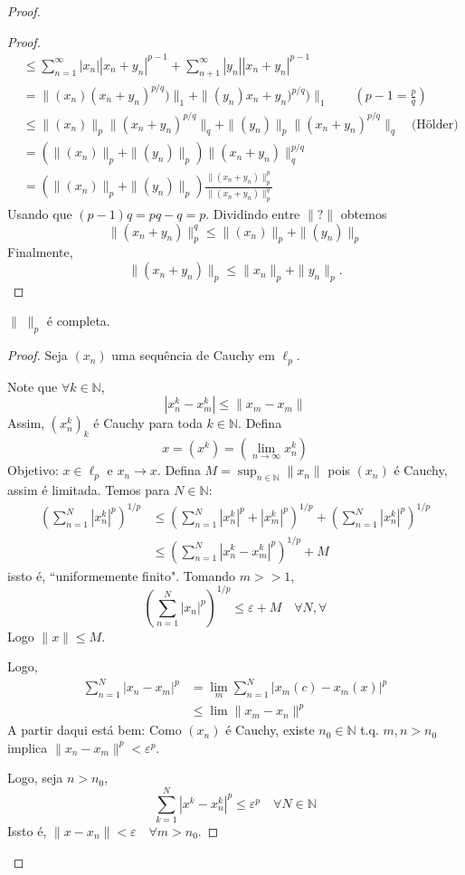 \documentclass[portuguese]{article}
\theoremstyle{definition}
\newcommand{\N}{\mathbb{N}}
\begin{document}
\begin{exer}
\begin{proof}
\begin{proof}
\begin{align*}
					&\leq\sum_{n=1}^\infty|x_n||x_n+y_n|^{p-1}+\sum_{n+1}^\infty|y_n||x_n+y_n|^{p-1}\\
					&=\|(x_n)(x_n+y_n)^{p/q})\|_1+\|(y_n)x_n+y_n)^{p/q})\|_1\qquad \left(p-1=\frac{p}{q}\right)\\
					&\leq\|(x_n)\|_p\|(x_n+y_n)^{p/q}\|_q+\|(y_n)\|_p\|(x_n+y_n)^{p/q}\|_q\quad\text{(Hölder)}\\
					&=(\|(x_n)\|_p+\|(y_n)\|_p)\|(x_n+y_n)\|_q^{p/q}\\
					&=(\|(x_n)\|_p+\|(y_n)\|_p)\frac{\|(x_n+y_n)\|_p^{p}}{\|(x_n+y_n)\|_p^q}
				\end{align*}
				Usando que $(p-1)q=pq-q=p$. {\color{orange}Dividindo entre $\|?\|$ obtemos
					\[\|(x_n+y_n)\|_p^{q}\leq\|(x_n)\|_p+\|(y_n)\|_p\]
					Finalmente,
					\[\|(x_n+y_n)\|_p\leq\| x_n\|_p+\| y_n\|_p.\]}
			\end{proof}
			\begin{af}
				$\|\;\|_p$ é completa.
			\end{af}
			\begin{proof}
				Seja $(x_n)$ uma sequência de Cauchy em $\ell_p$.
				
				Note que $\forall k\in\N$,
				\[|x_n^k-x_m^k|\leq \| x_m-x_m\|\]
				Assim, $(x_n^k)_k$ é Cauchy para toda $k\in\N$. Defina
				\[x=(x^k)=\left(\lim_{n\to\infty}x_n^k\right)\]
				Objetivo: $x\in\ell_p$ e $x_n\to x$.
				Defina $M=\sup_{n\in\N}\| x_n\|$ pois $(x_n)$ é Cauchy, assim é limitada. Temos para $N\in\N$:
				\begin{align*}
					\left(\sum_{n=1}^N|x_n^k|^p\right)^{1/p}
					&\leq\left(\sum_{n=1}^N|x^k_n|^p+|x_m^k|^p\right)^{1/p}+\left(\sum_{n=1}^N|x_n^k|^p\right)^{1/p}\\
					&\leq \left(\sum_{n=1}^N |x^k_n-x^k_m|^p\right)^{1/p}+M
				\end{align*}
				issto é, ``uniformemente finito".
				Tomando $m>>1$,
				\[\left(\sum_{n=1}^N|x_n|^p\right)^{1/p}\leq\varepsilon+M\quad\forall N,\forall\]
				Logo $\| x\|\leq M$.
				
				Logo,
				\begin{align*}
					\sum_{n=1}^N|x_n-x_m|^p&=\lim_m\sum_{n=1}^N|x_m(c)-x_m(x)|^p\\
					&\leq \lim\| x_m-x_n\|^p
				\end{align*}
				{\color{magenta}A partir daqui está bem: }Como $(x_n)$ é Cauchy, existe $n_0\in\N$ t.q. $m,n>n_0$ implica $\| x_n-x_m\|^p<\varepsilon^p$.
				
				Logo, seja $n>n_0$, 
				\[\sum_{k=1}^N|x^k-x_n^k|^p\leq\varepsilon^p\quad\forall N\in\N\]
				Issto é, $\| x -x_n\|<\varepsilon\quad\forall m>n_0$.
			\end{proof}
		\end{proof}
	\end{exer}
\end{document}
